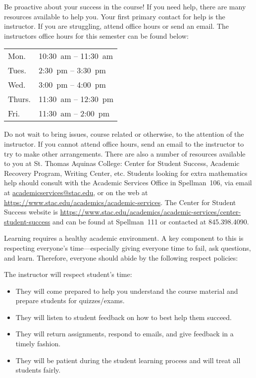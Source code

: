 \documentclass[11pt,letterpaper]{article}
\begin{document}
Be proactive about your success in the course! If you need help, there are many resources available to help you. Your first primary contact for help is the instructor. If you are struggling, attend office hours or send an email. The instructors office hours for this semester can be found below:
	\begin{table}[!ht]
	\centering
	\begin{tabular}{l || l}
	Mon. & 10:30~am -- 11:30~am \\
	Tues. & 2:30~pm -- 3:30~pm \\
	Wed. & 3:00~pm -- 4:00~pm \\
	Thurs. & 11:30~am -- 12:30~pm \\
	Fri. & 11:30~am -- 2:00~pm
	\end{tabular}
	\end{table}
Do not wait to bring issues, course related or otherwise, to the attention of the instructor. If you cannot attend office hours, send an email to the instructor to try to make other arrangements. There are also a number of resources available to you at St. Thomas Aquinas College: Center for Student Success, Academic Recovery Program, Writing Center, etc. Students looking for extra mathematics help should consult with the Academic Services Office in Spellman~106, via email at \href{mailto:AcademicServices@stac.edu}{academicservices@stac.edu}, or on the web at \href{https://www.stac.edu/academics/academic-services}{https://www.stac.edu/academics/academic-services}. The Center for Student Success website is \url{https://www.stac.edu/academics/academic-services/center-student-success} and can be found at Spellman~111 or contacted at 845.398.4090.
\sectionbreak



Learning requires a healthy academic environment. A key component to this is respecting everyone's time---especially giving everyone time to fail, ask questions, and learn. Therefore, everyone should abide by the following respect policies: 





\newpage





The instructor will respect student's time:
	\begin{itemize}
	\item They will come prepared to help you understand the course material and prepare students for quizzes/exams. 
	\item They will listen to student feedback on how to best help them succeed. 
	\item They will return assignments, respond to emails, and give feedback in a timely fashion. 
	\item They will be patient during the student learning process and will treat all students fairly. 
	\end{itemize} \pspace
\end{document}
